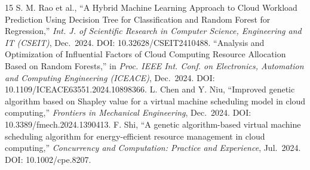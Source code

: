 \documentclass[conference]{IEEEtran}
\begin{document}
\begin{thebibliography}{15}
 S. M. Rao et al., ``A Hybrid Machine Learning Approach to Cloud Workload Prediction Using Decision Tree for Classification and Random Forest for Regression,'' \textit{Int. J. of Scientific Research in Computer Science, Engineering and IT (CSEIT)}, Dec.~2024. DOI: 10.32628/CSEIT2410488.
 ``Analysis and Optimization of Influential Factors of Cloud Computing Resource Allocation Based on Random Forests,'' in \textit{Proc. IEEE Int. Conf. on Electronics, Automation and Computing Engineering (ICEACE)}, Dec.~2024. DOI: 10.1109/ICEACE63551.2024.10898366.
 L. Chen and Y. Niu, ``Improved genetic algorithm based on Shapley value for a virtual machine scheduling model in cloud computing,'' \textit{Frontiers in Mechanical Engineering}, Dec.~2024. DOI: 10.3389/fmech.2024.1390413.
 F. Shi, ``A genetic algorithm-based virtual machine scheduling algorithm for energy-efficient resource management in cloud computing,'' \textit{Concurrency and Computation: Practice and Experience}, Jul.~2024. DOI: 10.1002/cpe.8207.
\end{thebibliography}
\end{document}
